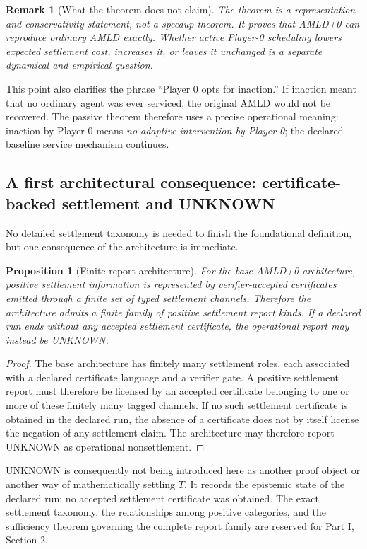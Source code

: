 \documentclass[11pt]{article}
\newtheorem{proposition}[definition]{Proposition}
\newtheorem{remark}[definition]{Remark}
\begin{document}
\begin{remark}[What the theorem does not claim]
The theorem is a representation and conservativity statement, not a speedup theorem. It proves that AMLD+0 can reproduce ordinary AMLD exactly. Whether active Player-0 scheduling lowers expected settlement cost, increases it, or leaves it unchanged is a separate dynamical and empirical question.
\end{remark}

This point also clarifies the phrase ``Player 0 opts for inaction.'' If inaction meant that no ordinary agent was ever serviced, the original AMLD would not be recovered. The passive theorem therefore uses a precise operational meaning: inaction by Player 0 means \emph{no adaptive intervention by Player 0}; the declared baseline service mechanism continues.

\subsection{A first architectural consequence: certificate-backed settlement and UNKNOWN}

No detailed settlement taxonomy is needed to finish the foundational definition, but one consequence of the architecture is immediate.

\begin{proposition}[Finite report architecture]
For the base AMLD+0 architecture, positive settlement information is represented by verifier-accepted certificates emitted through a finite set of typed settlement channels. Therefore the architecture admits a finite family of positive settlement report kinds. If a declared run ends without any accepted settlement certificate, the operational report may instead be UNKNOWN.
\end{proposition}

\begin{proof}
The base architecture has finitely many settlement roles, each associated with a declared certificate language and a verifier gate. A positive settlement report must therefore be licensed by an accepted certificate belonging to one or more of these finitely many tagged channels. If no such settlement certificate is obtained in the declared run, the absence of a certificate does not by itself license the negation of any settlement claim. The architecture may therefore report UNKNOWN as operational nonsettlement.
\end{proof}

UNKNOWN is consequently not being introduced here as another proof object or another way of mathematically settling $T$. It records the epistemic state of the declared run: no accepted settlement certificate was obtained. The exact settlement taxonomy, the relationships among positive categories, and the sufficiency theorem governing the complete report family are reserved for Part I, Section 2.
\end{document}
